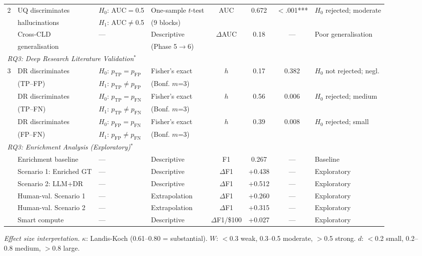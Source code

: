 \begin{table}[H]
\begin{threeparttable}
{\begin{tabular}{llp{3.2cm}p{2.8cm}cccl}
\midrule
2 & UQ discriminates & $H_0$: AUC$=$0.5 & One-sample $t$-test & AUC & 0.672 & $<$.001*** & $H_0$ rejected; moderate \\
 & hallucinations & $H_1$: AUC$\neq$0.5 & (9 blocks) &  &  &  &  \\
 & Cross-CLD & --- & Descriptive & $\Delta$AUC & 0.18 & --- & Poor generalisation \\
 & generalisation &  & (Phase 5$\to$6) &  &  &  &  \\
\midrule
\multicolumn{8}{l}{\textit{RQ3: Deep Research Literature Validation}$^{\ast}$} \\
\midrule
3 & DR discriminates & $H_0$: $p_{\text{TP}}=p_{\text{FP}}$ & Fisher's exact & $h$ & 0.17 & 0.382 & $H_0$ not rejected; negl. \\
 & (TP--FP) & $H_1$: $p_{\text{TP}}\neq p_{\text{FP}}$ & (Bonf. $m$=3) &  &  &  &  \\
 & DR discriminates & $H_0$: $p_{\text{TP}}=p_{\text{FN}}$ & Fisher's exact & $h$ & 0.56 & 0.006 & $H_0$ rejected; medium \\
 & (TP--FN) & $H_1$: $p_{\text{TP}}\neq p_{\text{FN}}$ & (Bonf. $m$=3) &  &  &  &  \\
 & DR discriminates & $H_0$: $p_{\text{FP}}=p_{\text{FN}}$ & Fisher's exact & $h$ & 0.39 & 0.008 & $H_0$ rejected; small \\
 & (FP--FN) & $H_1$: $p_{\text{FP}}\neq p_{\text{FN}}$ & (Bonf. $m$=3) &  &  &  &  \\
\midrule
\multicolumn{8}{l}{\textit{RQ3: Enrichment Analysis (Exploratory)}$^{\ast}$} \\
\midrule
 & Enrichment baseline & --- & Descriptive & F1 & 0.267 & --- & Baseline \\
 & Scenario 1: Enriched GT & --- & Descriptive & $\Delta$F1 & +0.438 & --- & Exploratory \\
 & Scenario 2: LLM+DR & --- & Descriptive & $\Delta$F1 & +0.512 & --- & Exploratory \\
 & Human-val. Scenario 1 & --- & Extrapolation & $\Delta$F1 & +0.260 & --- & Exploratory \\
 & Human-val. Scenario 2 & --- & Extrapolation & $\Delta$F1 & +0.315 & --- & Exploratory \\
 & Smart compute & --- & Descriptive & $\Delta$F1/\$100 & +0.027 & --- & Exploratory \\
\bottomrule
\end{tabular}}
\begin{tablenotes}[flushleft]
\scriptsize
\setlength{\leftskip}{0pt}
\item \textit{Effect size interpretation.} $\kappa$: Landis-Koch (0.61--0.80 = substantial). $W$: $<$0.3 weak, 0.3--0.5 moderate, $>$0.5 strong. $d$: $<$0.2 small, 0.2--0.8 medium, $>$0.8 large.

\end{tablenotes}
\end{threeparttable}
\end{table}
